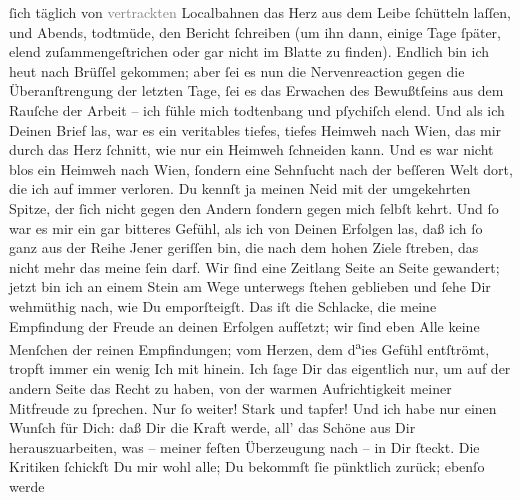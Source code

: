\begin{ledgroupsized}[t]{13cm}
               ſich täglich von \textcolor{gray}{vertrackten} Localbahnen das Herz aus dem Leibe
               ſchütteln laſſen, und Abends, todtmüde, den Bericht ſchreiben (um ihn dann\strikeout{)}, einige Tage ſpäter, elend zuſammengeſtrichen oder
               gar nicht im Blatte zu
               finden). Endlich  bin ich heut nach Brüſſel gekommen; aber ſei es nun die Nervenreaction gegen die
               Überanſtrengung der letzten Tage, ſei es das Erwachen des Bewußtſeins aus dem Rauſche
               der Arbeit – ich fühle mich todtenbang und pſychiſch elend. Und als ich Deinen Brief
               las, war es ein veritables tiefes, tiefes Heimweh nach Wien, das mir durch das Herz ſchnitt, {\pb}wie
               nur ein Heimweh ſchneiden kann. Und es war nicht blos ein Heimweh nach Wien, ſondern eine Sehnſucht nach der beſſeren Welt
               dort, die ich auf immer verloren. Du kennſt ja meinen Neid mit der umgekehrten
               Spitze, der ſich nicht gegen den Andern ſondern gegen mich ſelbſt kehrt. Und ſo war
               es mir ein gar bitteres Gefühl, als ich von Deinen Erfolgen las, daß ich ſo ganz aus
               der Reihe Jener geriſſen bin, die nach dem hohen Ziele ſtreben, das nicht mehr das
                   meine ſein darf. Wir ſind eine Zeitlang Seite an Seite gewandert; jetzt bin
               ich an einem Stein am Wege unterwegs ſtehen geblieben und ſehe Dir wehmüthig nach,
               wie Du emporſteigſt. Das iſt die Schlacke, die meine Empfindung der Freude an deinen
               Erfolgen aufſetzt; wir ſind eben Alle keine Menſchen der reinen Empfindungen; vom
               Herzen, dem d\substVorne{}\textsuperscript{a}\substDazwischen{}ie\substHinten{}s Gefühl entſtrömt, tropft immer ein wenig Ich mit hinein. Ich ſage Dir das
               eigentlich nur, um auf der andern Seite das Recht zu haben, von der warmen
               Aufrichtigkeit meiner Mitfreude zu ſprechen. Nur ſo weiter! Stark und tapfer! Und ich
               habe nur einen Wunſch für Dich: daß \strikeout{\textcolor{gray}{al}} Dir  die Kraft werde, all’ das Schöne
               aus Dir herauszuarbeiten, was – meiner feſten Überzeugung nach – in Dir ſteckt. Die
               Kritiken ſchickſt Du mir wohl alle; Du bekommſt ſie pünktlich zurück; ebenſo werde

\end{ledgroupsized}
